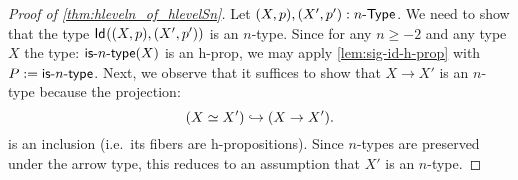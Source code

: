 \begin{proof}[Proof of \autoref{thm:hleveln_of_hlevelSn}]
 Let $(X, p), (X', p') : n\mbox{-}\mathsf{Type}$. We need to show that the type $\mathsf{Id}_{}((X, p),(X', p'))$ is an $n$-type. Since for any $n \geq -2$ and any type $X$ the type: $\mathsf{is}\mbox{-}{n}\mbox{-}\mathsf{type}(X)$ is an h-prop, we may apply \autoref{lem:sig-id-h-prop} with $P := \mathsf{is}\mbox{-}{n}\mbox{-}\mathsf{type}$. Next, we observe that it suffices to show that $X \rightarrow X'$ is an $n$-type because the projection:
 \[(X \simeq X') \hookrightarrow (X \rightarrow X').\]
 is an inclusion (i.e.~its fibers are h-propositions). Since $n$-types are preserved under the arrow type, this reduces to an assumption that $X'$ is an $n$-type.
\end{proof} 